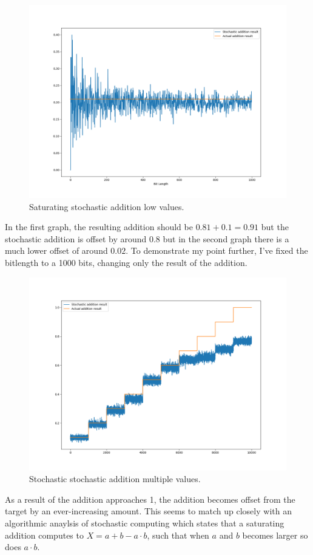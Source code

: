 \documentclass[a4paper,oneside,phd,etd]{BYUPhys}
\begin{document}
\begin{figure}[H]
\centering
\includegraphics[scale=0.4]{results/Figure_3_low.png}
\caption{Saturating stochastic addition low values.}
\label{fig:sat_low}
\end{figure}

In the first graph, the resulting addition should be $0.81+0.1=0.91$ but the stochastic addition is offset by around $0.8$ but in the second graph there is a much lower offset of around $0.02$. To demonstrate my point further, I've fixed the bitlength to a 1000 bits, changing only the result of the addition.

\begin{figure}[H]
\centering
\includegraphics[scale=0.4]{results/Figure_3_sss.png}
\caption{Stochastic stochastic addition multiple values.}
\label{fig:sat_add_multiple}
\end{figure}
As a result of the addition approaches 1, the addition becomes offset from the target by an ever-increasing amount. This seems to match up closely with an algorithmic anaylsis of stochastic computing which states that a saturating addition computes to $X = a+b-a\cdot b$\cite{logic-gates}, such that when $a$ and $b$ becomes larger so does $a\cdot b$.
\end{document}
